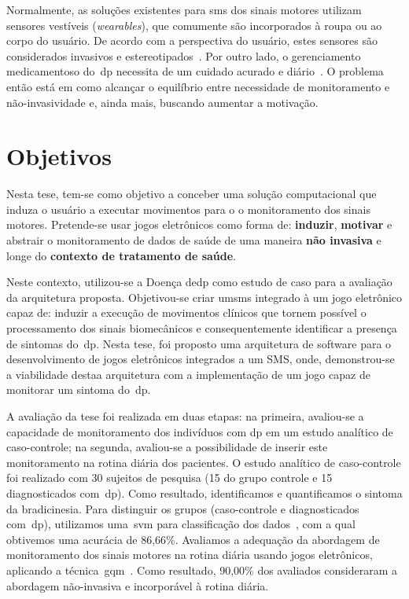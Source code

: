 Normalmente, as soluções existentes para \ac{sms} dos sinais motores utilizam sensores vestíveis (\textit{wearables}), que comumente são incorporados à roupa ou ao corpo do usuário. De acordo com a perspectiva do usuário, estes sensores são considerados invasivos e estereotipados~\cite{aarhus_negotiating_2010}. Por outro lado, o gerenciamento medicamentoso do~\ac{dp} necessita de um cuidado acurado e diário~\cite{quantitativeparkinson2011}. O problema então está em como alcançar o equilíbrio entre necessidade de monitoramento e não-invasividade e, ainda mais, buscando aumentar a motivação.

\section{Objetivos}
Nesta tese, tem-se como objetivo a conceber uma solução computacional que induza o usuário a executar movimentos para o o monitoramento dos sinais motores. Pretende-se usar jogos eletrônicos como forma de: \textbf{induzir}, \textbf{motivar} e abstrair o monitoramento de dados de saúde de uma maneira \textbf{não invasiva} e longe do \textbf{contexto de tratamento de saúde}.

Neste contexto, utilizou-se a Doença de\ac{dp} como estudo de caso para a avaliação da arquitetura proposta. Objetivou-se criar um\ac{sms} integrado à um jogo eletrônico capaz de: induzir a execução de movimentos clínicos que tornem possível o processamento dos sinais biomecânicos e consequentemente identificar a presença de sintomas do~\ac{dp}. Nesta tese, foi proposto uma arquitetura de software para o desenvolvimento de jogos eletrônicos integrados a um SMS, onde, demonstrou-se a viabilidade destaa arquitetura com a implementação de um jogo capaz de monitorar um sintoma do~\ac{dp}.

A avaliação da tese foi realizada em duas etapas: na primeira, avaliou-se a capacidade de monitoramento dos indivíduos com \ac{dp} em um estudo analítico de caso-controle; na segunda, avaliou-se a possibilidade de inserir este monitoramento na rotina diária dos pacientes. O estudo analítico de caso-controle foi realizado com 30 sujeitos de pesquisa (15 do grupo controle e 15 diagnosticados com~\ac{dp}). Como resultado, identificamos e quantificamos o sintoma da bradicinesia. Para distinguir os grupos (caso-controle e diagnosticados com~\ac{dp}), utilizamos uma~\ac{svm} para classificação dos dados~\cite{datamining2005}, com a qual obtivemos uma acurácia de 86,66\%. Avaliamos a adequação da abordagem de monitoramento dos sinais motores na rotina diária usando jogos eletrônicos, aplicando a técnica~\ac{gqm}~\cite{van1999goal}. Como resultado, 90,00\% dos avaliados consideraram a abordagem não-invasiva e incorporável à rotina diária. 

